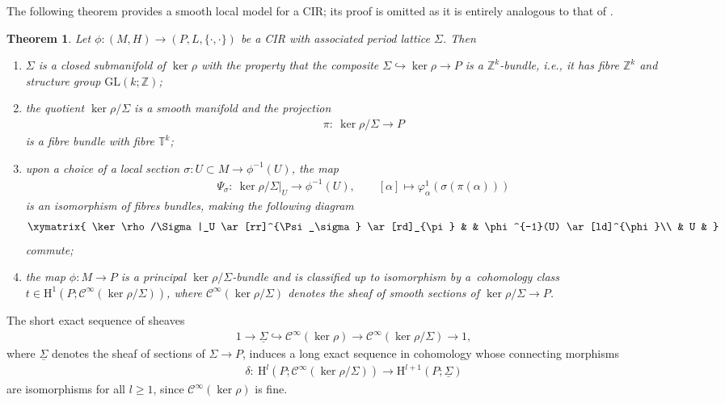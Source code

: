 \documentclass[10pt,a4paper]{amsart}
\numberwithin{equation}{section}
\newtheorem{Theorem}{Theorem}[section]
\newcommand{\JM}{(P,L,\{\cdot,\cdot\})} %
\newcommand{\CM}{(M,H)} %
\newcommand{\HH}{\mathrm{H}}
\newcommand{\ZZ}{\mathbb{Z}}
\begin{document}
The following theorem provides a smooth local model for a CIR; its proof is omitted as it is entirely analogous to that of \cite[Theorem~2.1]{dd}.

\begin{Theorem}\label{thm:local_model}
 Let $\phi\colon \CM\to\JM$ be a CIR with associated period lattice $\Sigma$. Then
 \begin{enumerate}[label={\rm (\Roman*)}, ref={\rm (\Roman*)}]\itemsep=0pt
 \item \label{item:1} $\Sigma$ is a closed submanifold of $\ker\rho$ with the property that the composite $\Sigma \hookrightarrow \ker \rho \to P$ is a $\ZZ^k$-bundle, i.e., it has fibre $\ZZ^k$ and structure group $\mathrm{GL}(k;\ZZ)$;
 \item \label{item:2} the quotient $\ker\rho/\Sigma$ is a smooth manifold and the projection
 \begin{gather*}
 \pi \colon \ \ker\rho/\Sigma \to P
 \end{gather*}
is a fibre bundle with fibre $\mathbb{T}^k$;
 \item \label{item:7} upon a choice of a local section $\sigma\colon U\subset M\to \phi^{-1}(U)$, the map
 \begin{gather}\label{eqn:local_isomorphism}
 \Psi_\sigma\colon \ \ker \rho/\Sigma|_U\to \phi^{-1}(U), \qquad [\alpha]\mapsto \varphi^1_{\alpha}(\sigma(\pi(\alpha)))
 \end{gather}
 is an isomorphism of fibres bundles, making the following diagram
 \begin{gather*}
 \xymatrix{
 \ker \rho/\Sigma|_U \ar[rr]^{\Psi_\sigma} \ar[rd]_{\pi} & & \phi^{-1}(U) \ar[ld]^{\phi}\\
 & U & }
 \end{gather*}
 commute;
 \item \label{item:18} the map $\phi \colon M \to P$ is a principal $\ker \rho/\Sigma$-bundle and is classified up to isomorphism by a~cohomology class $t \in \HH^1(P;\mathcal{C}^{\infty}(\ker \rho/\Sigma))$, where $\mathcal{C}^{\infty}(\ker \rho/\Sigma)$ denotes the sheaf of smooth sections of $\ker
 \rho/\Sigma \to P$.
 \end{enumerate}
\end{Theorem}

The short exact sequence of sheaves
\begin{gather*}
 1 \to \underline{\Sigma} \hookrightarrow \mathcal{C}^{\infty} (\ker \rho) \to \mathcal{C}^{\infty}(\ker \rho/\Sigma) \to 1,
\end{gather*}
where $ \underline{\Sigma}$ denotes the sheaf of sections of $\Sigma \to P$, induces a long exact sequence in cohomology whose connecting morphisms
\begin{gather*}
 \delta\colon \ \HH^{l}(P; \mathcal{C}^{\infty}(\ker \rho/\Sigma)) \to \HH^{l+1}(P;\underline{\Sigma})
\end{gather*}
are isomorphisms for all $l \geq 1$, since $\mathcal{C}^{\infty}(\ker \rho)$ is f\/ine.
\end{document}
